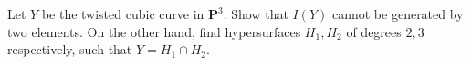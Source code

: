 Let $Y$ be the twisted cubic curve in $\mathbf{P}^3$. Show that $I(Y)$ cannot be generated by two elements. On the other hand, find hypersurfaces $H_1, H_2$ of degrees $2, 3$ respectively, such that $Y = H_1 \cap H_2$.
